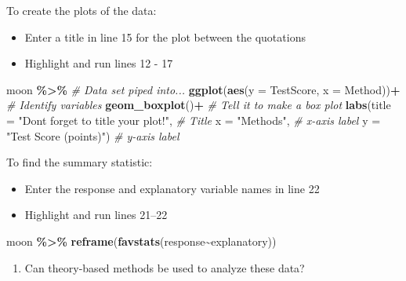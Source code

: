 \documentclass[
]{report}
\newenvironment{Shaded}{\begin{snugshade}}{\end{snugshade}}
\newcommand{\AttributeTok}[1]{\textcolor[rgb]{0.13,0.29,0.53}{#1}}
\newcommand{\CommentTok}[1]{\textcolor[rgb]{0.56,0.35,0.01}{\textit{#1}}}
\newcommand{\FunctionTok}[1]{\textcolor[rgb]{0.13,0.29,0.53}{\textbf{#1}}}
\newcommand{\NormalTok}[1]{#1}
\newcommand{\SpecialCharTok}[1]{\textcolor[rgb]{0.81,0.36,0.00}{\textbf{#1}}}
\newcommand{\StringTok}[1]{\textcolor[rgb]{0.31,0.60,0.02}{#1}}
\providecommand{\tightlist}{%
  \setlength{\itemsep}{0pt}\setlength{\parskip}{0pt}}
\begin{document}
To create the plots of the data:

\begin{itemize}
\item
  Enter a title in line 15 for the plot between the quotations
\item
  Highlight and run lines 12 - 17
\end{itemize}

\begin{Shaded}
\begin{Highlighting}[]
\NormalTok{moon }\SpecialCharTok{\%\textgreater{}\%}  \CommentTok{\# Data set piped into...}
  \FunctionTok{ggplot}\NormalTok{(}\FunctionTok{aes}\NormalTok{(}\AttributeTok{y =}\NormalTok{ TestScore, }\AttributeTok{x =}\NormalTok{ Method))}\SpecialCharTok{+}  \CommentTok{\# Identify variables}
  \FunctionTok{geom\_boxplot}\NormalTok{()}\SpecialCharTok{+}  \CommentTok{\# Tell it to make a box plot}
  \FunctionTok{labs}\NormalTok{(}\AttributeTok{title =} \StringTok{"Don\textquotesingle{}t forget to title your plot!"}\NormalTok{,  }\CommentTok{\# Title}
       \AttributeTok{x =} \StringTok{"Methods"}\NormalTok{,    }\CommentTok{\# x{-}axis label}
       \AttributeTok{y =} \StringTok{"Test Score (points)"}\NormalTok{)  }\CommentTok{\# y{-}axis label}
\end{Highlighting}
\end{Shaded}

To find the summary statistic:

\begin{itemize}
\item
  Enter the response and explanatory variable names in line 22
\item
  Highlight and run lines 21--22
\end{itemize}

\begin{Shaded}
\begin{Highlighting}[]
\NormalTok{moon }\SpecialCharTok{\%\textgreater{}\%}
  \FunctionTok{reframe}\NormalTok{(}\FunctionTok{favstats}\NormalTok{(response}\SpecialCharTok{\textasciitilde{}}\NormalTok{explanatory))}
\end{Highlighting}
\end{Shaded}

\begin{enumerate}
\def\labelenumi{\arabic{enumi}.}
\setcounter{enumi}{3}
\tightlist
\item
  Can theory-based methods be used to analyze these data?
\end{enumerate}
\end{document}
